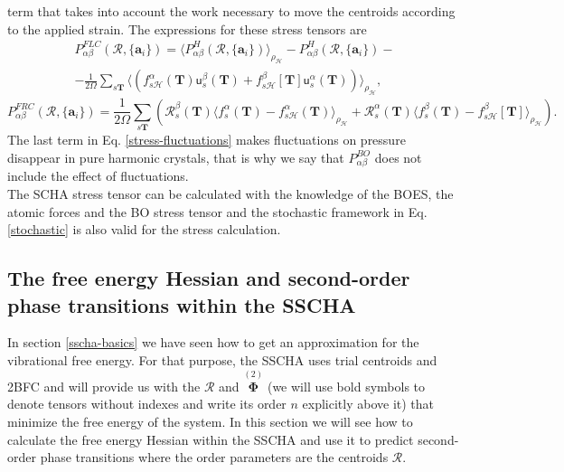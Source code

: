 term that takes into account the work necessary to move the centroids according to the applied strain. The expressions for these stress tensors are
\begin{multline}
 \label{stress-fluctuations}
 P_{\alpha\beta}^{FLC}(\boldsymbol{\mathcal{R}},\{\mathbf{a}_{i}\})=\langle P_{\alpha\beta}^{H}(\boldsymbol{\mathcal{R}},\{\mathbf{a}_{i}\})\rangle_{\rho_{\mathcal{H}}}-
 P_{\alpha\beta}^{H}(\boldsymbol{\mathcal{R}},\{\mathbf{a}_{i}\})- \\ -\frac{1}{2\Omega}\sum_{s\mathbf{T}}\langle(f_{s\mathcal{H}}^{\alpha}(\mathbf{T})\mathsf{u}_{s}^{\beta}(\mathbf{T})+
 f_{s\mathcal{H}}^{\beta}[\mathbf{T}]\mathsf{u}_{s}^{\alpha}(\mathbf{T}))\rangle_{\rho_{\mathcal{H}}},
\end{multline}
\begin{equation}
 P_{\alpha\beta}^{FRC}(\boldsymbol{\mathcal{R}},\{\mathbf{a}_{i}\})=\frac{1}{2\Omega}\sum_{s\mathbf{T}}(\mathcal{R}_{s}^{\beta}(\mathbf{T})\langle f_{s}^{\alpha}(\mathbf{T})-f_{s\mathcal{H}}^{\alpha}(\mathbf{
 T})\rangle_{\rho_{\mathcal{H}}}+\mathcal{R}_{s}^{\alpha}(\mathbf{T})\langle f_{s}^{\beta}(\mathbf{T})-f_{s\mathcal{H}}^{\beta}[\mathbf{T}]\rangle_{\rho_{\mathcal{H}}}).
\end{equation}
The last term in Eq. \ref{stress-fluctuations} makes fluctuations on pressure disappear in pure harmonic crystals\cite{monacelli2018pressure}, that is why we say that $P_{\alpha\beta}^{BO}$ does not include the effect
of fluctuations. \\

The SCHA stress tensor can be calculated with the knowledge of the BOES, the atomic forces and the BO stress tensor and the stochastic framework in Eq. \ref{stochastic} is also valid for the stress calculation. 

\subsection{The free energy Hessian and second-order phase transitions within the SSCHA}

In section \ref{sscha-basics} we have seen how to get an approximation for the vibrational free energy. For that purpose, the SSCHA uses trial centroids and 2BFC and will provide us with the $\boldsymbol{\mathcal{R}}$ 
and $\overset{(2)}{\boldsymbol{\Phi}}$ (we will use bold symbols to denote tensors without indexes and write its order $n$ explicitly above it) that minimize the free energy of the system. In this section we will see 
how to calculate the free energy Hessian within the SSCHA and use it to predict second-order phase transitions where the order parameters are the centroids $\boldsymbol{\mathcal{R}}$. \\

